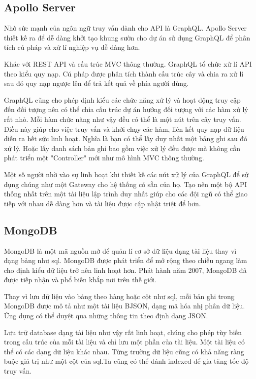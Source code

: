 \documentclass[11pt]{report}
\begin{document}
	\subsection{Apollo Server}
	
	Nhờ sức mạnh của ngôn ngữ truy vấn dành cho API là GraphQL. Apollo Server thiết kế ra để dễ dàng khởi tạo khung sườn cho dự án sử dụng GraphQL để phân tích cú pháp và xử lí nghiệp vụ dễ dàng hơn.
	
	Khác với REST API và cấu trúc MVC thông thường. GraphQL tổ chức xử lí API theo kiểu quy nạp. Cú pháp được phân tích thành cấu trúc cây và chia ra xử lí sau đó quy nạp ngược lên để trả kết quả về phía người dùng.
	
	GraphQL cũng cho phép định kiểu các chức năng xử lý và hoạt động truy cập đến đối tượng nên có thể chia cấu trúc dự án hướng đối tượng với các hàm xử lý rất nhỏ. Mỗi hàm chức năng như vậy đều có thể là một nút trên cây truy vấn. Điều này giúp cho việc truy vấn và khởi chạy các hàm, liên kết quy nạp dữ liệu diễn ra hết sức linh hoạt. Nghĩa là bạn có thể lấy duy nhất một bảng ghi sau đó xử lý. Hoặc lấy danh sách bản ghi bao gồm việc xử lý đều được mà không cần phát triển một "Controller" mới như mô hình MVC thông thường.
	
	Một số người nhờ vào sự linh hoạt khi thiết kế các nút xử lý của GraphQL để sử dụng chúng như một Gateway cho hệ thống có sẵn của họ. Tạo nên một bộ API thống nhất trên một tài liệu lập trình duy nhất giúp cho các đội ngũ có thể giao tiếp với nhau dễ dàng hơn và tài liệu được cập nhật triệt để hơn.
	
	\subsection{MongoDB}
	MongoDB là một mã nguồn mở để quản lí cơ sở dữ liệu dạng tài liệu thay vì dạng bảng như \acrshort{sql}. MongoDB được phát triển để mở rộng theo chiều ngang làm cho định kiểu dữ liệu trở nên linh hoạt hơn. Phát hành năm 2007, MongoDB đã được tiếp nhận và phổ biến khắp nơi trên thế giới.
	
	Thay vì lưu dữ liệu vào bảng theo hàng hoặc cột như \acrshort{sql}, mỗi bản ghi trong MongoDB được mô tả như một tài liệu BJSON, dạng mã hóa nhị phân dữ liệu. Ứng dụng có thể duyệt qua những thông tin theo định dạng JSON.
	
	Lưu trữ database dạng tài liệu như vậy rất linh hoạt, chúng cho phép tùy biến trong cấu trúc của mỗi tài liệu và chỉ lưu một phần của tài liệu. Một tài liệu có thể có các dạng dữ liệu khác nhau. Từng trường dữ liệu cũng có khả năng ràng buộc giá trị như một cột của \acrshort{sql}.Ta cũng có thể đánh indexed để gia tăng tốc độ truy vấn.
	
\end{document}
